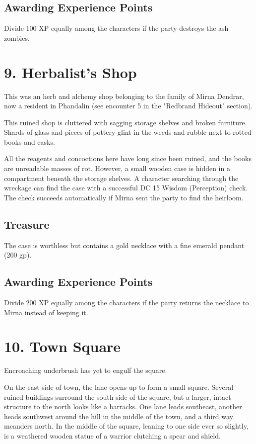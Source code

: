 \documentclass[10pt,a4paper,twoside,bg=print,twocolumn,openany,nodeprecatedcode]{dndbook}
\begin{document}
\subsection{Awarding Experience Points}
Divide 100 XP equally among the characters if the party destroys the ash zombies.

\section{9. Herbalist's Shop}
This was an herb and alchemy shop belonging to the family of Mirna Dendrar, now a resident in Phandalin (see encounter 5 in the "Redbrand Hideout" section).

\begin{DndReadAloud}{}
This ruined shop is cluttered with sagging storage shelves and broken furniture. Shards of glass and pieces of pottery glint in the weeds and rubble next to rotted books and casks.

\end{DndReadAloud}

All the reagents and concoctions here have long since been ruined, and the books are unreadable masses of rot. However, a small wooden case is hidden in a compartment beneath the storage shelves. A character searching through the wreckage can find the case with a successful DC 15 Wisdom (Perception) check. The check succeeds automatically if Mirna sent the party to find the heirloom.

\subsection{Treasure}
The case is worthless but contains a gold necklace with a fine emerald pendant (200 gp).

\subsection{Awarding Experience Points}
Divide 200 XP equally among the characters if the party returns the necklace to Mirna instead of keeping it.

\section{10. Town Square}
Encroaching underbrush has yet to engulf the square.

\begin{DndReadAloud}{}
On the east side of town, the lane opens up to form a small square. Several ruined buildings surround the south side of the square, but a larger, intact structure to the north looks like a barracks. One lane leads southeast, another heads southwest around the hill in the middle of the town, and a third way meanders north. In the middle of the square, leaning to one side ever so slightly, is a weathered wooden statue of a warrior clutching a spear and shield.

\end{DndReadAloud}
\end{document}
